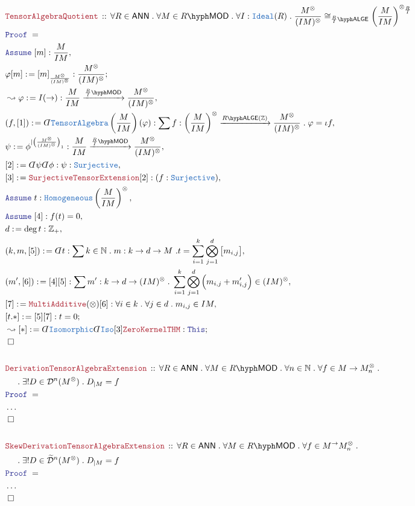 \documentclass[12pt]{scrartcl}%
\newcommand{\TYPE}[1]{\textcolor{NavyBlue}{\mathtt{#1}}}%
\newcommand{\LOGIC}[1]{\textcolor{Blue}{\mathtt{#1}}}%
\newcommand{\THM}[1]{\textcolor{Maroon}{\mathtt{#1}}}%
\renewcommand{\.}{\; . \;} %
\newcommand{\de}{: \kern 0.1pc =} %
\newcommand{\Theorem}[2]{& \THM{#1} \, :: \, #2 \\ & \Proof = \\ } %
\newcommand{\NewLine}{\\ & \kern 1pc}%
\newcommand{\Page}[1]{ \begin{align*} #1 \end{align*}  }%
\newcommand{ \bd }{ \ByDef }%
\newcommand{\NoProof}{ & \ldots \\ \EndProof}%
\newcommand{\Int}{\mathbb{Z}}%
\newcommand{\Nat}{\mathbb{N}}%
\newcommand{\Say}[3]{& #1 \de #2 : #3, \\} %
\newcommand{\Conclude}[3]{& #1 \de #2 : #3; \\}%
\newcommand{\Derive}[3]{& \leadsto #1 \de #2 : #3, \\} %
\newcommand{\DeriveConclude}[3]{& \leadsto #1 \de #2 : #3 ; \\} %
\newcommand{\Assume}[2]{& \LOGIC{Assume} \; #1 : #2, \\} %
\newcommand{\QED}{\; \square} %
\newcommand{\EndProof}{& \QED \\} %
\newcommand{\ByDef}{\rotatebox[origin=c]{-180}{$D$}}%
\newcommand{\Proof}{\LOGIC{Proof} \; } %
\newcommand{\Arrow}[1]{\xrightarrow{#1}}%
\newcommand{\D}{\mathcal{D}}
\newcommand{\LMOD}[1]{#1\hyph\mathsf{MOD}} %
\newcommand{\ANN}{\mathsf{ANN}} %
\newcommand{\LALGE}[1]{#1\hyph\mathsf{ALGE}}%
\begin{document}
\Page{
	\Theorem{TensorAlgebraQuotient}{
		\forall R \in \ANN \. 
		\forall M \in \LMOD{R} \. 
		\forall I : \TYPE{Ideal}(R) \. 
		\frac{M^\otimes}{(IM)^\otimes} \cong_{\LALGE{\frac{R}{I}}}  
		\left( \frac{M}{IM} \right)^{\otimes_{\frac{R}{I}}}   
	}
	\Assume{[m]}{\frac{M}{IM}}
	\Conclude{\varphi[m]}{ [m]_{\frac{M^\otimes}{(IM)^\otimes}} }{\frac{M^\otimes}{(IM)^\otimes}} 
	\Derive{\varphi}{I(\to)}{\frac{M}{IM} \Arrow{\LMOD{\frac{R}{I}}} \frac{M^\otimes}{(IM)^\otimes}  }
	\Say{(f,[1])}{\bd \TYPE{TensorAlgebra}\left( \frac{M}{IM} \right)(\varphi)}{ \sum f : \left(  \frac{M}{IM}\right)^\otimes \Arrow{\LALGE{R}(\Int)} \frac{M^\otimes}{(IM)^\otimes} \. \varphi = \iota f }
	\Say{\psi}{\phi^{|\left(\frac{M^\otimes}{(IM)^\otimes} \right)_1 } }{  \frac{M}{IM} \Arrow{\LMOD{\frac{R}{I}}}  \frac{M^\otimes}{(IM)^\otimes}    }
	\Say{[2]}{\bd \psi \bd \phi}{ \psi : \TYPE{Surjective} }
	\Say{[3]}{\THM{SurjectiveTensorExtension}[2]}{(f : \TYPE{Surjective} )}
	\Assume{t}{\TYPE{Homogeneous}\left( \frac{M}{IM} \right)^\otimes}
	\Assume{[4]}{f(t) = 0}
	\Say{d}{\deg t}{\Int_+}
	\Say{(k,m,[5])}{\bd t}{\sum k \in \Nat \. m : k \to d \to M \ . t = \sum^k_{i=1} \bigotimes^d_{j=1} \big[m_{i,j}\big]  }
	\Say{(m',[6])}{[4][5]}{ \sum  m' : k \to d \to (IM)^\otimes \. \sum^k_{i=1} \bigotimes^d_{j=1} \Big( m_{i,j} +  m_{i,j}' \Big) \in (IM)^\otimes }
	\Say{[7]}{\THM{MultiAdditive}(\otimes)[6]}{\forall i \in k \. \forall j \in d \. m_{i,j} \in IM}
	\Conclude{[t.*]}{[5][7]}{t = 0}
	\DeriveConclude{[*]}{ \bd \TYPE{Isomorphic}\bd \TYPE{Iso}[3]\THM{ZeroKernelTHM}}{\LOGIC{This}}
	\EndProof
	\\
	\Theorem{DerivationTensorAlgebraExtension}{\forall R \in \ANN \. \forall M \in \LMOD{R} \. \forall n \in \Nat \.  \forall f \in M \to M^\otimes_n \. \NewLine \.  \exists! D \in \D^n(M^\otimes) \. D_{|M} = f}
	\NoProof
	\\
	\Theorem{SkewDerivationTensorAlgebraExtension}{\forall R \in \ANN \. \forall M \in \LMOD{R} \.  \forall f \in M^ \to M^\otimes_n \. \NewLine \.  \exists! D \in \widetilde{\D}^n(M^\otimes) \. D_{|M} = f}
	\NoProof
}
\newpage
\end{document}
